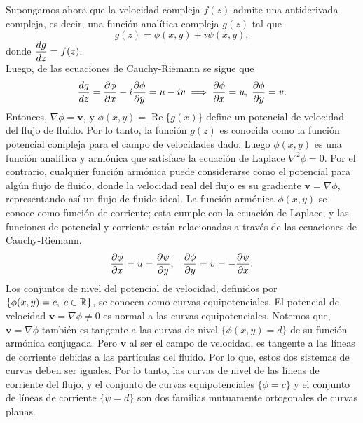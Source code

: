 Supongamos ahora que la velocidad compleja $f(z)$ admite una antiderivada compleja, es decir, una
función analítica compleja $g(z)$ tal que 
\begin{equation}\label{ec3-6}
	g(z)=\phi(x,y)+i\psi(x,y),
\end{equation}
donde $\dfrac{dg}{dz}=f(z)$.\\
Luego, de las ecuaciones de Cauchy-Riemann se sigue que
\[
\dfrac{dg}{dz}=\dfrac{\partial\phi}{\partial x}-i\dfrac{\partial\phi}{\partial y}=u-iv \implies \dfrac{\partial\phi}{\partial x}=u,\; \dfrac{\partial\phi}{\partial y}=v.
\]
Entonces, $\nabla\phi=\textbf{v}$, y $\phi(x,y)=\operatorname{Re}\{g(x)\}$ define un potencial de velocidad del flujo de fluido. Por lo tanto, la función $g(z)$ es conocida como la función potencial compleja para el campo de velocidades dado. Luego $ \phi(x, y)$ es una función analítica y armónica que satisface la ecuación de Laplace $\nabla^{2}\phi= 0$. Por el contrario, cualquier función armónica puede considerarse como el potencial para algún flujo de fluido, donde la velocidad real del flujo es su gradiente $\textbf{v} = \nabla\phi$, representando así un flujo de fluido ideal. La función armónica $\phi(x, y)$ se conoce como función de corriente; esta cumple con la ecuación de Laplace, y las funciones de potencial y corriente están relacionadas a través de las ecuaciones de Cauchy-Riemann.
\begin{equation}\label{ec3-7}
	\dfrac{\partial\phi}{\partial x}=u=\dfrac{\partial\psi}{\partial y},\;\;\; \dfrac{\partial\phi}{\partial y}=v=-\dfrac{\partial\psi}{\partial x}.
\end{equation}
Los conjuntos de nivel del potencial de velocidad, definidos por $\{\phi(x,y)=c,\;c\in\mathbb{R}\}$, se conocen como curvas equipotenciales. El potencial de velocidad $\textbf{v}=\nabla \phi\neq 0$ es normal a las curvas equipotenciales. Notemos que, $\textbf{v}=\nabla \phi$ también es tangente a las curvas de nivel $\{\phi(x,y)=d\}$ de su función armónica conjugada. Pero $\textbf{v}$ al ser el campo de velocidad, es tangente a las líneas de corriente debidas a las partículas del fluido. Por lo que, estos dos sistemas de curvas deben ser iguales. Por lo tanto, las curvas de nivel de las líneas de corriente del flujo, y el conjunto de curvas equipotenciales $\{\phi=c\}$ y el conjunto de líneas de corriente $\{\psi=d\}$  son dos familias mutuamente ortogonales de curvas planas.  


